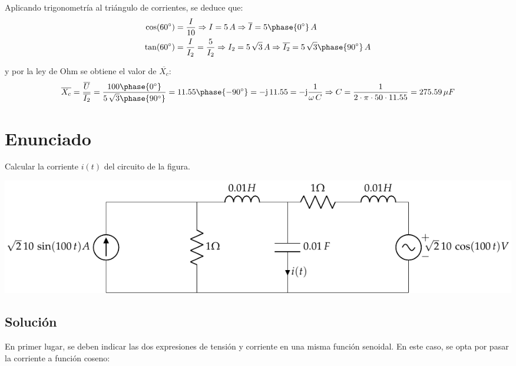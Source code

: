Aplicando trigonometría al triángulo de corrientes, se deduce que:
\begin{align*}
  \cos(60^\circ)&=\dfrac{I}{10}\Rightarrow I=5\,A\Rightarrow
                  \overline{I}=5\phase{0^\circ}\,A\\
  \tan(60^\circ)&=\dfrac{I}{I_2}=\dfrac{5}{I_2}\Rightarrow
                  I_2=5\,\sqrt{3}\,A\Rightarrow
                  \overline{I_2}=5\,\sqrt{3}\phase{90^\circ}\,A
\end{align*}

y por la ley de Ohm se obtiene el valor de $\overline{X_c}$:
\begin{equation*}
  \overline{X_c}=\dfrac{\overline{U}}{\overline{I_2}}=\dfrac{100\phase{0^\circ}}{5\,\sqrt{3}\phase{90^\circ}}=11.55\phase{-90^\circ}=-\mathrm{j}\,11.55=-\mathrm{j}\dfrac{1}{\omega\,C}\Rightarrow
  C=\dfrac{1}{2\cdot\pi\cdot 50\cdot 11.55}=275.59\,\mu F
\end{equation*}
\section{Enunciado}

Calcular la corriente $i(t)$ del circuito de la figura.

\begin{center}
  \includegraphics{figuras/BT2_13.pdf}
\end{center}

\subsection*{Solución}

En primer lugar, se deben indicar las dos expresiones de tensión y
corriente en una misma función senoidal. En este caso, se opta por
pasar la corriente a función coseno:

